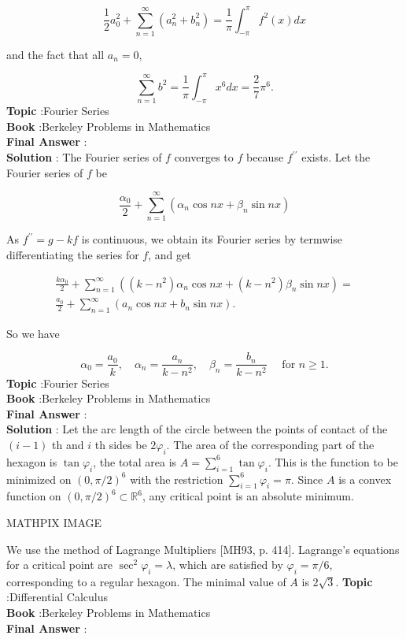 \documentclass[10pt]{article}
\begin{document}
$$
\frac{1}{2} a_{0}^{2}+\sum_{n=1}^{\infty}\left(a_{n}^{2}+b_{n}^{2}\right)=\frac{1}{\pi} \int_{-\pi}^{\pi} f^{2}(x) d x
$$

and the fact that all $a_{n}=0$,

$$
\sum_{n=1}^{\infty} b^{2}=\frac{1}{\pi} \int_{-\pi}^{\pi} x^{6} d x=\frac{2}{7} \pi^{6} .
$$
\textbf{Topic} :Fourier Series \\
\textbf{Book} :Berkeley Problems in Mathematics\\
\textbf{Final Answer} :\\


\textbf{Solution} : The Fourier series of $f$ converges to $f$ because $f^{\prime \prime}$ exists. Let the Fourier series of $f$ be

$$
\frac{\alpha_{0}}{2}+\sum_{n=1}^{\infty}\left(\alpha_{n} \cos n x+\beta_{n} \sin n x\right)
$$

As $f^{\prime \prime}=g-k f$ is continuous, we obtain its Fourier series by termwise differentiating the series for $f$, and get

$$
\begin{gathered}
\frac{k \alpha_{0}}{2}+\sum_{n=1}^{\infty}\left(\left(k-n^{2}\right) \alpha_{n} \cos n x+\left(k-n^{2}\right) \beta_{n} \sin n x\right)= \\
\frac{a_{0}}{2}+\sum_{n=1}^{\infty}\left(a_{n} \cos n x+b_{n} \sin n x\right) .
\end{gathered}
$$

So we have

$$
\alpha_{0}=\frac{a_{0}}{k}, \quad \alpha_{n}=\frac{a_{n}}{k-n^{2}}, \quad \beta_{n}=\frac{b_{n}}{k-n^{2}} \quad \text { for } n \geqslant 1 .
$$
\textbf{Topic} :Fourier Series \\
\textbf{Book} :Berkeley Problems in Mathematics\\
\textbf{Final Answer} :\\


\textbf{Solution} : Let the arc length of the circle between the points of contact of the $(i-1)$ th and $i$ th sides be $2 \varphi_{i}$. The area of the corresponding part of the hexagon is $\tan \varphi_{i}$, the total area is $A=\sum_{i=1}^{6} \tan \varphi_{i}$. This is the function to be minimized on $(0, \pi / 2)^{6}$ with the restriction $\sum_{i=1}^{6} \varphi_{i}=\pi$. Since $A$ is a convex function on $(0, \pi / 2)^{6} \subset \mathbb{R}^{6}$, any critical point is an absolute minimum.

MATHPIX IMAGE

We use the method of Lagrange Multipliers [MH93, p. 414]. Lagrange's equations for a critical point are $\sec ^{2} \varphi_{i}=\lambda$, which are satisfied by $\varphi_{i}=\pi / 6$, corresponding to a regular hexagon. The minimal value of $A$ is $2 \sqrt{3}$.
\textbf{Topic} :Differential Calculus \\
\textbf{Book} :Berkeley Problems in Mathematics\\
\textbf{Final Answer} :\\
\end{document}

